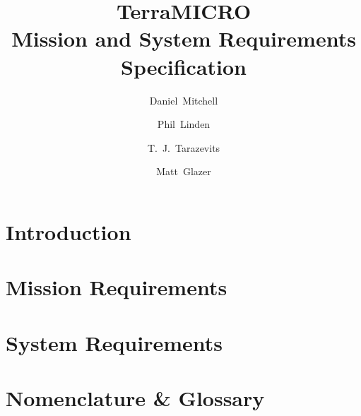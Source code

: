 \documentclass[conf]{new-aiaa}
\title{TerraMICRO \\ Mission and System Requirements
    Specification}
\author{Daniel~Mitchell}
\affil{\github{ddm9599}}
\author{Phil~Linden}
\affil{\github{philiplinden}}
\author{T.~J.~Tarazevits}
\affil{\github{venku22}}
\author{Matt~Glazer}
\affil{\github{mglazer}}
\begin{document}
\maketitle%

\newcommand\subdir{tex} %

\section{Introduction}
    

\section{Mission Requirements}
    

\section{System Requirements}
    

% 
% 

\section{Nomenclature \& Glossary}
    
\end{document}
